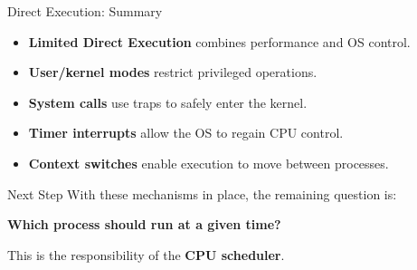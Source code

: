 \begin{frame}{Direct Execution: Summary}

\begin{itemize}
    \item \textbf{Limited Direct Execution} combines performance and OS control.
    \item \textbf{User/kernel modes} restrict privileged operations.
    \item \textbf{System calls} use traps to safely enter the kernel.
    \item \textbf{Timer interrupts} allow the OS to regain CPU control.
    \item \textbf{Context switches} enable execution to move between processes.
\end{itemize}

\vspace{0.4cm}

\begin{block}{Next Step}
With these mechanisms in place, the remaining question is:

\begin{center}
\textbf{Which process should run at a given time?}
\end{center}

This is the responsibility of the \textbf{CPU scheduler}.
\end{block}

\end{frame}